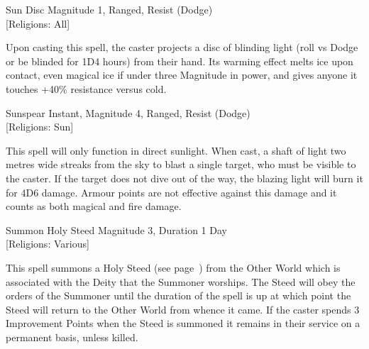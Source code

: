 \begin{rpg-spell}
{Sun Disc}
{Magnitude 1, Ranged, Resist (Dodge)\\{[Religions: All]}}

Upon casting this spell, the caster projects a disc of blinding light (roll vs Dodge or be blinded for 1D4 hours) from their hand. Its warming effect melts ice upon contact, even magical ice if under three Magnitude in power, and gives anyone it touches +40\% resistance versus cold.
\end{rpg-spell}

\begin{rpg-spell}
{Sunspear}
{Instant, Magnitude 4, Ranged, Resist (Dodge)\\{[Religions: Sun]}}

This spell will only function in direct sunlight. When cast, a shaft of light two metres wide streaks from the sky to blast a single target, who must be visible to the caster. If the target does not dive out of the way, the blazing light will burn it for 4D6 damage. Armour points are not effective against this damage and it counts as both magical and fire damage. 
\end{rpg-spell}

\begin{rpg-spell}
{Summon Holy Steed}
{Magnitude 3, Duration 1 Day\\{[Religions: Various]}}

This spell summons a Holy Steed (see page~\pageref{monster:holy-steed}) from the Other World which is associated with the Deity that the Summoner worships. The Steed will obey the orders of the Summoner until the duration of the spell is up at which point the Steed will return to the Other World from whence it came. If the caster spends 3 Improvement Points when the Steed is summoned it remains in their service on a permanent basis, unless killed.
\end{rpg-spell}

